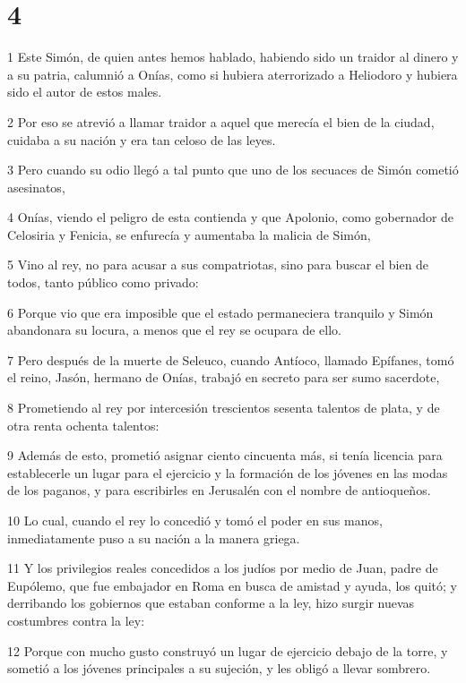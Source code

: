 \chapter{4}

\par 1 Este Simón, de quien antes hemos hablado, habiendo sido un traidor al dinero y a su patria, calumnió a Onías, como si hubiera aterrorizado a Heliodoro y hubiera sido el autor de estos males.
\par 2 Por eso se atrevió a llamar traidor a aquel que merecía el bien de la ciudad, cuidaba a su nación y era tan celoso de las leyes.
\par 3 Pero cuando su odio llegó a tal punto que uno de los secuaces de Simón cometió asesinatos,
\par 4 Onías, viendo el peligro de esta contienda y que Apolonio, como gobernador de Celosiria y Fenicia, se enfurecía y aumentaba la malicia de Simón,
\par 5 Vino al rey, no para acusar a sus compatriotas, sino para buscar el bien de todos, tanto público como privado:
\par 6 Porque vio que era imposible que el estado permaneciera tranquilo y Simón abandonara su locura, a menos que el rey se ocupara de ello.
\par 7 Pero después de la muerte de Seleuco, cuando Antíoco, llamado Epífanes, tomó el reino, Jasón, hermano de Onías, trabajó en secreto para ser sumo sacerdote,
\par 8 Prometiendo al rey por intercesión trescientos sesenta talentos de plata, y de otra renta ochenta talentos:
\par 9 Además de esto, prometió asignar ciento cincuenta más, si tenía licencia para establecerle un lugar para el ejercicio y la formación de los jóvenes en las modas de los paganos, y para escribirles en Jerusalén con el nombre de antioqueños.
\par 10 Lo cual, cuando el rey lo concedió y tomó el poder en sus manos, inmediatamente puso a su nación a la manera griega.
\par 11 Y los privilegios reales concedidos a los judíos por medio de Juan, padre de Eupólemo, que fue embajador en Roma en busca de amistad y ayuda, los quitó; y derribando los gobiernos que estaban conforme a la ley, hizo surgir nuevas costumbres contra la ley:
\par 12 Porque con mucho gusto construyó un lugar de ejercicio debajo de la torre, y sometió a los jóvenes principales a su sujeción, y les obligó a llevar sombrero.
